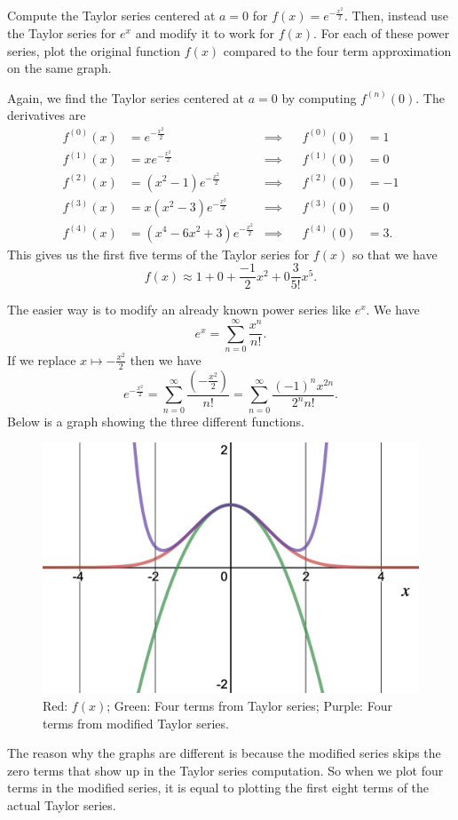 \documentclass[12pt]{article} %
\begin{document}
\newpage
\begin{problem} 
Compute the Taylor series centered at $a=0$ for $f(x)=e^{-\frac{x^2}{2}}$. Then, instead use the Taylor series for $e^x$ and modify it to work for $f(x)$.  For each of these power series, plot the original function $f(x)$ compared to the four term approximation on the same graph.
\end{problem}
\begin{solution}
Again, we find the Taylor series centered at $a=0$ by computing $f^{(n)}(0)$. The derivatives are
    \begin{align*}
        f^{(0)}(x) &= e^{-\frac{x^2}{2}} &\implies&& f^{(0)}(0)&=1\\
        f^{(1)}(x) &= xe^{-\frac{x^2}{2}} &\implies&& f^{(1)}(0)&=0\\
        f^{(2)}(x) &= (x^2-1)e^{-\frac{x^2}{2}} &\implies&& f^{(2)}(0)&=-1\\
        f^{(3)}(x) &= x(x^2-3)e^{-\frac{x^2}{2}} &\implies&& f^{(3)}(0)&=0\\
        f^{(4)}(x) &= (x^4-6x^2+3)e^{-\frac{x^2}{2}} &\implies&& f^{(4)}(0)&=3.
    \end{align*}
    This gives us the first five terms of the Taylor series for $f(x)$ so that we have
    \[
    f(x)\approx 1 + 0 + \frac{-1}{2}x^2 + 0 \frac{3}{5!}x^5.
    \]
    
    The easier way is to modify an already known power series like $e^x$. We have
    \[
    e^x = \sum_{n=0}^\infty \frac{x^n}{n!}.
    \]
    If we replace $x\mapsto -\frac{x^2}{2}$ then we have
    \[
    e^{-\frac{x^2}{2}} = \sum_{n=0}^\infty \frac{ \left( -\frac{x^2}{2}\right)}{n!} = \sum_{n=0}^\infty \frac{(-1)^n x^{2n}}{2^n n!}.
    \]
    Below is a graph showing the three different functions.
    \begin{figure}[H]
        \centering
        \includegraphics[width=.8\textwidth]{Homework_5/desmos-graph(4).png}
        \caption{Red: $f(x)$; Green: Four terms from Taylor series; Purple: Four terms from modified Taylor series.}
        \label{fig:my_label}
    \end{figure}
    \begin{remark}
    The reason why the graphs are different is because the modified series skips the zero terms that show up in the Taylor series computation. So when we plot four terms in the modified series, it is equal to plotting the first eight terms of the actual Taylor series.
    \end{remark}
\end{solution}
\end{document}
